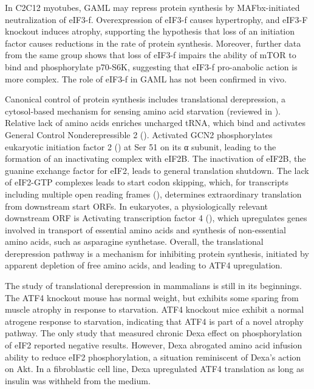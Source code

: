 \documentclass[12pt,english]{report}\usepackage[]{graphicx}\usepackage[]{color}
\begin{document}
In C2C12 myotubes, GAML may repress protein synthesis by MAFbx-initiated
neutralization of eIF3-f\citep{lagirand-cantaloube2008initiation}.
Overexpression of eIF3-f causes hypertrophy, and eIF3-F knockout induces
atrophy, supporting the hypothesis that loss of an initiation factor
causes reductions in the rate of protein synthesis. Moreover, further
data from the same group shows that loss of eIF3-f impairs the ability
of mTOR to bind and phosphorylate p70-S6K, suggesting that eIF3-f
pro-anabolic action is more complex\citep{csibi2010translation}.
The role of eIF3-f in GAML has not been confirmed in vivo.

Canonical control of protein synthesis includes translational derepression,
a cytosol-based mechanism for sensing amino acid starvation (reviewed
in \citep{gallinetti2013amino}). Relative lack of amino acids enriches
uncharged tRNA, which bind and activates General Control Nonderepressible
2 ()\citep{berlanga1999characterization}.
Activated GCN2 phosphorylates eukaryotic initiation factor 2 ()
at Ser 51 on its α subunit, leading to the formation of an inactivating
complex with eIF2B\citep{gross1987evidence}. The inactivation of
eIF2B, the guanine exchange factor for eIF2, leads to general translation
shutdown\citep{sood2000mammalian}. The lack of eIF2-GTP complexes
leads to start codon skipping, which, for transcripts including multiple
open reading frames (), determines
extraordinary translation from downstream start ORFs. In eukaryotes,
a physiologically relevant downstream ORF is Activating transcription
factor 4 (),
which upregulates genes involved in transport of essential amino acids
and synthesis of non-essential amino acids, such as asparagine synthetase\citep{gjymishka2009transcriptional}.
Overall, the translational derepression pathway is a mechanism for
inhibiting protein synthesis, initiated by apparent depletion of free
amino acids, and leading to ATF4 upregulation.

The study of translational derepression in mammalians is still in
its beginnings. The ATF4 knockout mouse has normal weight, but exhibits
some sparing from muscle atrophy in response to starvation\citep{ebert2012stress-induced}.
ATF4 knockout mice exhibit a normal atrogene response to starvation,
indicating that ATF4 is part of a novel atrophy pathway. The only
study that measured chronic Dexa effect on phosphorylation of eIF2
reported negative results\citep{liu2004glucocorticoids}. However,
Dexa abrogated amino acid infusion ability to reduce eIF2 phosphorylation,
a situation reminiscent of Dexa's action on Akt. In a fibroblastic
cell line, Dexa upregulated ATF4 translation as long as insulin was
withheld from the medium\citep{adams2007role}.
\end{document}
